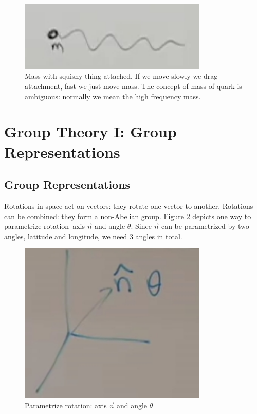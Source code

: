 \documentclass[]{article}
\begin{document}
\begin{figure}[H]
	\caption[Mass (quark) with squishy thing attached]{Mass with squishy thing attached. If we move slowly we drag attachment, fast we just move mass. The concept of mass of quark is ambiguous: normally we mean the high frequency mass.}\label{fig:2-2-mass1}
	\includegraphics[width=0.8\textwidth]{2-2-mass1}
\end{figure}


\section{Group Theory I: Group Representations}

\subsection{Group Representations}

Rotations in space act on vectors: they rotate one vector to another. Rotations can be combined: they form a non-Abelian group. Figure \ref{fig:2-3-paramerize-rotation} depicts one way to parametrize rotation--axis $\vec{n}$ and angle $\theta$. Since $\vec{n}$ can be parametrized by two angles, latitude and longitude, we need 3 angles in total.

\begin{figure}[H]
	\begin{center}
		\caption{Parametrize rotation: axis $\vec{n}$ and angle $\theta$}\label{fig:2-3-paramerize-rotation}
		\includegraphics[width=0.8\textwidth]{2-3-paramerize-rotation}
	\end{center}
\end{figure}
\end{document}
